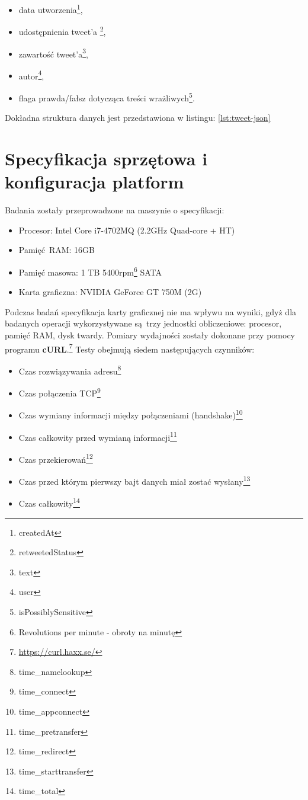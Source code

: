 \begin{itemize}\label{items:tweet-fields}
	\item data utworzenia\footnote{createdAt},
	\item udostępnienia tweet'a \footnote{retweetedStatus},
	\item zawartość tweet'a\footnote{text},
	\item autor\footnote{user},
	\item flaga prawda/fałsz dotycząca treści wrażliwych\footnote{isPossiblySensitive}.
\end{itemize}
Dokładna struktura danych jest przedstawiona w listingu: \ref{lst:tweet-json}
  
\section{Specyfikacja sprzętowa i konfiguracja platform}
Badania zostały przeprowadzone na maszynie o specyfikacji:
\begin{itemize}
	\item Procesor: Intel Core i7-4702MQ (2.2GHz Quad-core + HT) 
	\item Pamięć RAM: 16GB
	\item Pamięć masowa: 1 TB 5400rpm\footnote{Revolutions per minute - obroty na minutę} SATA
	\item Karta graficzna: NVIDIA GeForce GT 750M (2G)  
\end{itemize}
Podczas badań specyfikacja karty graficznej nie ma wpływu na wyniki, gdyż dla badanych operacji wykorzystywane są trzy jednostki obliczeniowe: procesor, pamięć RAM, dysk twardy.
\newline Pomiary wydajności zostały dokonane przy pomocy programu \textbf{cURL}.\footnote{\url{https://curl.haxx.se/}} Testy obejmują siedem następujących czynników:
\begin{itemize}\label{items:time-descriptions}
	\item{Czas rozwiązywania adresu\footnote{time\_namelookup}}
	\item{Czas połączenia TCP\footnote{time\_connect}}
	\item{Czas wymiany informacji między połączeniami (handshake)\footnote{time\_appconnect}} 
	\item{Czas całkowity przed wymianą informacji\footnote{time\_pretransfer}}
	\item{Czas przekierowań\footnote{time\_redirect}}
	\item{Czas przed którym pierwszy bajt danych miał zostać wysłany\footnote{time\_starttransfer}}
	\item{Czas całkowity\footnote{time\_total}}
\end{itemize}
